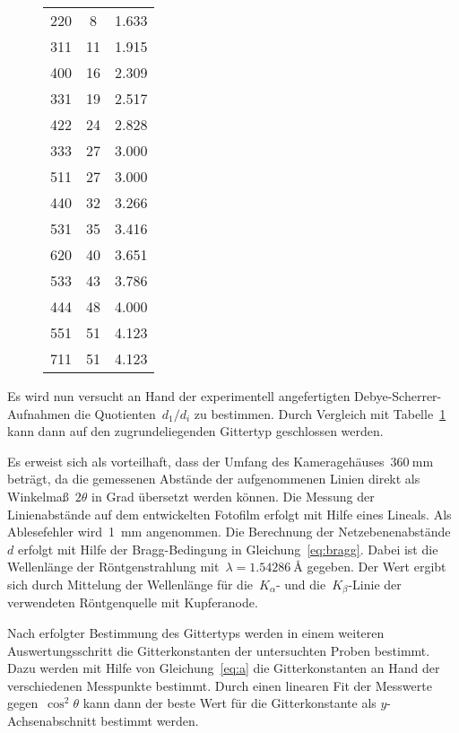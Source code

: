 \begin{figure}[h]
\begin{subtable}{0.45\textwidth}
\begin{tabular}{S[table-format=3]
                    S[table-format=2]
                    S[table-format=1.3]}
      220 &  8 & 1.633 \\
      311 & 11 & 1.915 \\
      400 & 16 & 2.309 \\
      331 & 19 & 2.517 \\
      422 & 24 & 2.828 \\
      333 & 27 & 3.000 \\
      511 & 27 & 3.000 \\
      440 & 32 & 3.266 \\
      531 & 35 & 3.416 \\
      620 & 40 & 3.651 \\
      533 & 43 & 3.786 \\
      444 & 48 & 4.000 \\
      551 & 51 & 4.123 \\
      711 & 51 & 4.123 \\
      \bottomrule
    \end{tabular}
  \end{subtable}
  \label{tab:theorie}
\end{figure}

Es wird nun versucht an Hand der experimentell angefertigten
Debye-Scherrer-Aufnahmen die Quotienten~$d_1/d_i$ zu bestimmen. Durch Vergleich
mit Tabelle~\ref{tab:theorie} kann dann auf den zugrundeliegenden Gittertyp
geschlossen werden.

Es erweist sich als vorteilhaft, dass der Umfang des
Kameragehäuses~$\SI{360}{\milli\metre}$ beträgt, da die gemessenen Abstände der
aufgenommenen Linien direkt als Winkelmaß~$2\theta$ in Grad übersetzt werden
können. Die Messung der Linienabstände auf dem entwickelten Fotofilm erfolgt mit
Hilfe eines Lineals. Als Ablesefehler wird~\SI{1}{\milli\metre} angenommen. Die
Berechnung der Netzebenenabstände~$d$ erfolgt mit Hilfe der Bragg-Bedingung in
Gleichung~\eqref{eq:bragg}. Dabei ist die Wellenlänge der Röntgenstrahlung
mit~$\lambda=\SI{1.54286}{\angstrom}$ gegeben. Der Wert ergibt sich durch
Mittelung der Wellenlänge für die~$K_{\alpha}$- und die~$K_{\beta}$-Linie der
verwendeten Röntgenquelle mit Kupferanode.

Nach erfolgter Bestimmung des Gittertyps werden in einem weiteren
Auswertungsschritt die Gitterkonstanten der untersuchten Proben bestimmt. Dazu
werden mit Hilfe von Gleichung~\eqref{eq:a} die Gitterkonstanten an Hand der
verschiedenen Messpunkte bestimmt. Durch einen linearen Fit der Messwerte
gegen~$\cos^2\theta$ kann dann der beste Wert für die Gitterkonstante als
$y$-Achsenabschnitt bestimmt werden.

